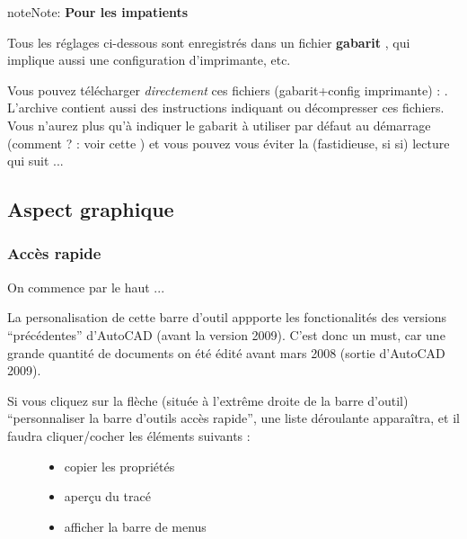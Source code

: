 \documentclass[a4paper,12pt,french]{sphinxmanual}
\begin{document}
\begin{notice}{note}{Note:}
\textbf{Pour les impatients}

Tous les réglages ci-dessous sont enregistrés dans un fichier \textbf{gabarit} , qui implique aussi une configuration d'imprimante, etc.

Vous pouvez télécharger \emph{directement} ces fichiers (gabarit+config imprimante) :  . L'archive contient aussi des instructions indiquant ou décompresser ces fichiers. Vous n'aurez plus qu'à indiquer le gabarit à utiliser par défaut au démarrage (comment ? : voir cette {\hyperref[acad/config_acad:chrgt\string-gabarit]{}}) et vous pouvez vous éviter la (fastidieuse, si si) lecture qui suit ...
\end{notice}


\subsection{Aspect graphique}
\label{acad/config_acad:aspect-graphique}

\subsubsection{Accès rapide}
\label{acad/config_acad:acces-rapide}
On commence par le haut ...

La personalisation de cette barre d'outil appporte les fonctionalités des versions ``précédentes'' d'AutoCAD (avant la version 2009). C'est donc un must, car une grande quantité de documents on été édité avant mars 2008 (sortie d'AutoCAD 2009).
\begin{description}
\item[{Si vous cliquez sur la flèche (située à l'extrême droite de la barre d'outil) ``personnaliser la barre d'outils accès rapide'', une liste déroulante apparaîtra, et il faudra cliquer/cocher les éléments suivants :}] \leavevmode\begin{itemize}
\item {} 
copier les propriétés

\item {} 
aperçu du tracé

\item {} 
afficher la barre de menus

\end{itemize}

\end{description}
\end{document}

